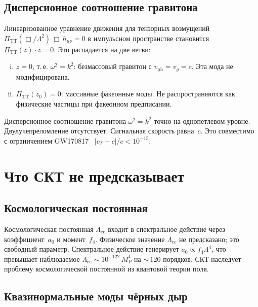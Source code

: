 \documentclass[12pt,a4paper]{article}
\theoremstyle{plain}
\theoremstyle{definition}
\theoremstyle{remark}
\begin{document}
\subsection{Дисперсионное соотношение гравитона}
\label{sec:dispersion}

Линеаризованное уравнение движения для тензорных возмущений
$\Pi_{\mathrm{TT}}(\Box/\Lambda^2)\,\Box\, h_{\mu\nu} = 0$
в импульсном пространстве становится
$\Pi_{\mathrm{TT}}(z)\cdot z = 0$. Это распадается на две ветви:
\begin{enumerate}[(i)]
\item $z = 0$, т.\,е. $\omega^2 = k^2$: безмассовый гравитон
  с $v_{\mathrm{ph}} = v_g = c$. Эта мода не модифицирована.
\item $\Pi_{\mathrm{TT}}(z_0) = 0$: массивные факеонные моды.
  Не распространяются как физические частицы при факеонном
  предписании.
\end{enumerate}

Дисперсионное соотношение гравитона $\omega^2 = k^2$ точно
на однопетлевом уровне. Двулучепреломление отсутствует.
Сигнальная скорость равна~$c$. Это совместимо с ограничением
GW170817~\cite{GW170817:2017}
$|c_T - c|/c < 10^{-15}$.

\section{Что СКТ не предсказывает}
\label{sec:negative}

\subsection{Космологическая постоянная}
\label{sec:cc}

Космологическая постоянная $\Lambda_{\mathrm{cc}}$ входит в
спектральное действие через коэффициент~$a_0$ и момент~$f_4$.
Физическое значение $\Lambda_{\mathrm{cc}}$ не предсказано; это
свободный параметр. Спектральное действие генерирует
$a_0 \propto f_4 \Lambda^4$, что превышает наблюдаемое
$\Lambda_{\mathrm{cc}} \sim 10^{-122}\, M_P^4$ на
${\sim}\,120$ порядков. СКТ наследует проблему космологической
постоянной из квантовой теории поля.

\subsection{Квазинормальные моды чёрных дыр}
\label{sec:qnm}
\end{document}

